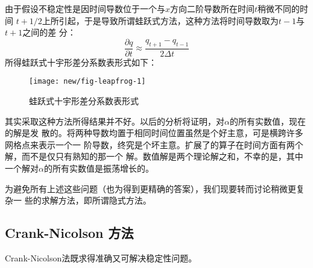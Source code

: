 由于假设不稳定性是因时间导数位于一个与$x$方向二阶导数所在时间$t$稍微不同的时间
$t+1/2$上所引起，于是导致所谓蛙跃式方法，这种方法将时间导数取为$t-1$与$t+1$之间的差
分：
\begin{equation}
\frac{\partial q}{\partial t}\approx \frac{q_{t+1}-q_{t-1}}{2\Delta t}
\label{eq:ex2.2.10}
\end{equation}
所得蛙跃式十宇形差分系数表形式如下：
\begin{figure}[H]
\centering
\texttt{[image: new/fig-leapfrog-1]}
\caption[fig-leapforg-1]{蛙跃式十宇形差分系数表形式}
\label{fig:new/fig-leapfrog-1}
\end{figure}
其实采取这种方法所得结果并不好。以后的分析将证明，对$\alpha$的所有实数值，现在的解是发
散的。将两种导数均置于相同时间位置虽然是个好主意，可是横跨许多网格点来表示一个一
阶导数，终究是个坏主意。扩展了的算子在时间方面有两个解，而不是仅只有熟知的那一个
解。数值解是两个理论解之和，不幸的是，其中一个解对$\alpha$的所有实数值是振荡增长的。

为避免所有上述这些问题（也为得到更精确的答案），我们现要转而讨论稍微更复杂一
些的求解方法，即所谓隐式方法。

\subsection{Crank-Nicolson 方法}
\label{sec:2.2.6}

Crank-Nicolson法既求得准确又可解决稳定性问题。

